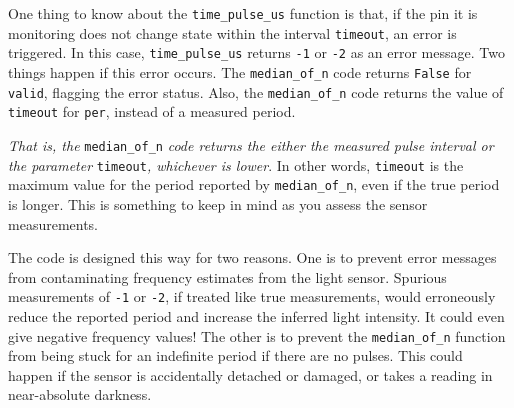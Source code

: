 One thing to know about the \lstinline{time_pulse_us} function is that, if the pin it is monitoring does not change state within the interval \texttt{timeout}, an error is triggered.
In this case, \lstinline{time_pulse_us} returns \texttt{-1} or \texttt{-2} as an error message.
Two things happen if this error occurs.
The \lstinline{median_of_n} code returns \texttt{False} for \lstinline{valid}, flagging the error status.
Also, the  \lstinline{median_of_n} code returns the value of \texttt{timeout} for \lstinline{per}, instead of a measured period. 

\emph{That is, the} \lstinline{median_of_n} \emph{code returns the either the measured pulse interval or the parameter} \lstinline{timeout}\emph{, whichever is lower}.
In other words, \texttt{timeout} is the maximum value for the period reported by \lstinline{median_of_n}, even if the true period is longer.
This is something to keep in mind as you assess the sensor measurements.

The code is designed this way for two reasons.
One is to prevent error messages from contaminating frequency estimates from the light sensor. 
Spurious measurements of \texttt{-1} or \texttt{-2}, if treated like true measurements, would erroneously reduce the reported period and increase the inferred light intensity.
It could even give negative frequency values!
The other is to prevent the \lstinline{median_of_n} function from being stuck for an indefinite period if there are no pulses.
This could happen if the sensor is accidentally detached or damaged, or takes a reading in near-absolute darkness.


